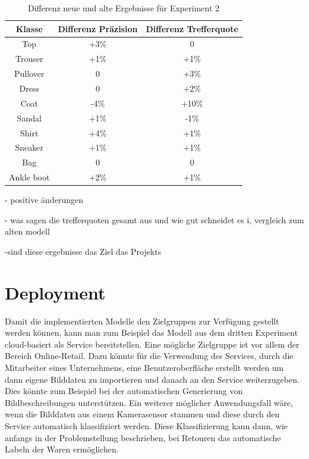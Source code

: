 \documentclass[12pt]{scrreprt}
\begin{document}
\begin{table}[h!]
	\begin{center}
		\begin{tabular}{|c|c|c|}
			\hline
			Klasse & Differenz Präzision & Differenz Trefferquote \\
			\hline
			Top  & +3\% & 0\\
			\hline
			Trouser  & +1\% & +1\%  \\
			\hline
			Pullover   & 0 & +3\% \\
			\hline
			Dress   & 0 & +2\% \\
			\hline
			Coat   & -4\% & +10\% \\
			\hline
			Sandal & +1\% & -1\% \\
			\hline
			Shirt & +4\% & +1\% \\
			\hline
			Sneaker & +1\% & +1\% \\
			\hline
			Bag & 0 & 0 \\
			\hline
			Ankle boot & +2\% & +1\% \\
			\hline
		\end{tabular}
		\caption{Differenz neue und alte Ergebnisse für Experiment 2}
		\label{tab:differenz2}
	\end{center}
\end{table}

- positive änderungen 

- was sagen die trefferquoten gesamt aus und wie gut schneidet es i, vergleich zum alten modell

-sind diese ergebnisse das Ziel das Projekts


\section{Deployment}\label{dp:dp}

Damit die implementierten Modelle den Zielgruppen zur Verfügung gestellt werden können, kann man zum Beispiel das Modell aus dem dritten Experiment cloud-basiert als Service bereitstellen. Eine mögliche Zielgruppe ist vor allem der Bereich Online-Retail. Dazu könnte für die Verwendung des Services, durch die Mitarbeiter eines Unternehmens, eine Benutzeroberfläche erstellt werden um dann eigene Bilddaten zu importieren und danach an den Service weiterzugeben. Dies könnte zum Beispiel bei der automatischen Generierung von Bildbeschreibungen unterstützen. Ein weiterer möglicher Anwendungsfall wäre, wenn die Bilddaten aus einem Kamerasensor stammen und diese durch den Service automatisch klassifiziert werden. Diese Klassifizierung kann dann, wie anfangs in der Problemstellung beschrieben, bei Retouren das automatische Labeln der Waren ermöglichen. 
\end{document}
